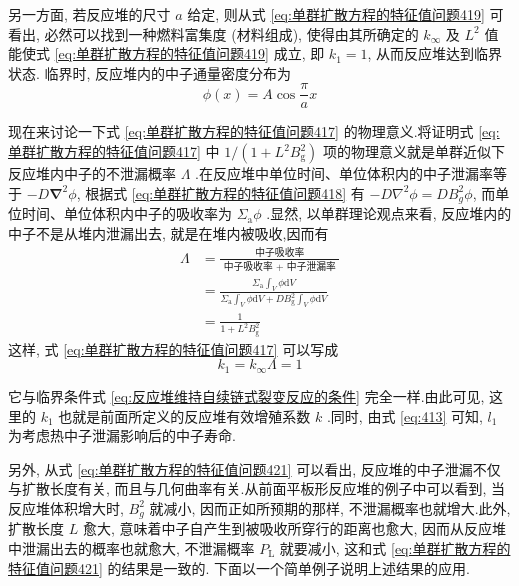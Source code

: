 \documentclass{Sichuan Normal University}
\begin{document}
另一方面, 若反应堆的尺寸 $a$ 给定, 则从式 \eqref{eq:单群扩散方程的特征值问题419} 可看出, 必然可以找到一种燃料富集度 (材料组成), 使得由其所确定的 $k_{\infty}$ 及 $L^2$ 值能使式 \eqref{eq:单群扩散方程的特征值问题419} 成立, 即 $k_1=1$, 从而反应堆达到临界状态.
临界时, 反应堆内的中子通量密度分布为
\begin{equation}
\phi(x)=A \cos \frac{\pi}{a} x
\label{eq:临界时反应堆内的中子通量密度分布}
\end{equation}

现在来讨论一下式 \eqref{eq:单群扩散方程的特征值问题417} 的物理意义.将证明式 \eqref{eq:单群扩散方程的特征值问题417} 中 $1 /\left(1+L^2 B_{\mathrm{g}}^2\right)$ 项的物理意义就是单群近似下反应堆内中子的不泄漏概率 $\Lambda$ .在反应堆中单位时间、单位体积内的中子泄漏率等于 $-D \boldsymbol{\nabla}^2 \phi$, 根据式 \eqref{eq:单群扩散方程的特征值问题418} 有 $-D \nabla^2 \phi=D B_g^2 \phi$, 而单位时间、单位体积内中子的吸收率为 $\Sigma_{\mathrm{a}} \phi$ .显然, 以单群理论观点来看, 反应堆内的中子不是从堆内泄漏出去, 就是在堆内被吸收,因而有
\begin{equation}
\begin{aligned}
\Lambda & =\frac{\text { 中子吸收率 }}{\text { 中子吸收率 }+ \text { 中子泄漏率 }} \\
& =\frac{\Sigma_{\mathrm{a}} \int_V \phi \mathrm{d} V}{\Sigma_{\mathrm{a}} \int_V \phi \mathrm{d} V+D B_{\mathrm{g}}^2 \int_V \phi \mathrm{d} V} \\
& =\frac{1}{1+L^2 B_{\mathrm{g}}^2}
\end{aligned}
\label{eq:单群扩散方程的特征值问题421}
\end{equation}
这样, 式 \eqref{eq:单群扩散方程的特征值问题417} 可以写成
\begin{equation}
k_1=k_{\infty} \Lambda=1
\end{equation}

它与临界条件式 \eqref{eq:反应堆维持自续链式裂变反应的条件} 完全一样.由此可见, 这里的 $k_1$ 也就是前面所定义的反应堆有效增殖系数 $k$ .同时, 由式 \eqref{eq:413} 可知, $l_1$ 为考虑热中子泄漏影响后的中子寿命.

另外, 从式 \eqref{eq:单群扩散方程的特征值问题421} 可以看出, 反应堆的中子泄漏不仅与扩散长度有关, 而且与几何曲率有关.从前面平板形反应堆的例子中可以看到, 当反应堆体积增大时, $B_g^2$ 就减小, 因而正如所预期的那样, 不泄漏概率也就增大.此外,扩散长度 $L$ 愈大, 意味着中子自产生到被吸收所穿行的距离也愈大, 因而从反应堆中泄漏出去的概率也就愈大, 不泄漏概率 $P_{\mathrm{L}}$ 就要减小, 这和式 \eqref{eq:单群扩散方程的特征值问题421} 的结果是一致的.
下面以一个简单例子说明上述结果的应用.
\end{document}
